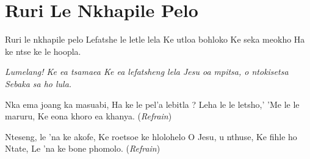 \starttocol
\chapter{Ruri Le Nkhapile Pelo}
\nexttocol
\hfill{\it }
\stoptocol
\starttocol
\startlines
{\sc Ruri} le nkhapile pelo
Lefatshe le letle lela
Ke utloa bohloko
Ke seka meokho
Ha ke ntse ke le hoopla.

{\it Lumelang!  Ke ea tsamaea
Ke ea lefatsheng lela
Jesu oa mpitsa, o ntokisetsa 
Sebaka sa ho lula.}

Nka ema joang ka masuabi,
Ha ke le pel'a lebitla ?
Leha le le letsho,'
'Me le le maruru,
Ke eona khoro ea khanya.
          \hfill({\it Refrain})~~~~~~~~~

Nteseng, le 'na ke akofe,
Ke roetsoe ke hlolohelo
O Jesu,  u nthuse,
Ke fihle ho Ntate,
Le 'na ke bone phomolo.
          \hfill({\it Refrain})~~~~~~~~~

\stoplines
\nexttocol

\stoptocol
